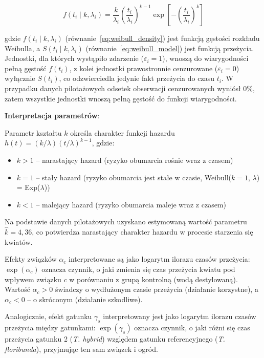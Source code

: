 \documentclass[12pt, a4paper]{article}
\begin{document}
\begin{equation}\label{eq:weibull_density}
    f(t_i \mid k, \lambda_i) = \frac{k}{\lambda_i}\!\left(\frac{t_i}{\lambda_i}\right)^{k-1}
    \exp\!\left[-\!\left(\frac{t_i}{\lambda_i}\right)^k\right]
\end{equation}

gdzie $f(t_i \mid k, \lambda_i)$ (równanie~\eqref{eq:weibull_density}) jest funkcją gęstości rozkładu Weibulla, a $S(t_i \mid k, \lambda_i)$
(równanie~\eqref{eq:weibull_model}) jest funkcją przeżycia. Jednostki, dla których wystąpiło zdarzenie
($\varepsilon_i = 1$), wnoszą do wiarygodności pełną gęstość $f(t_i)$, z kolei
jednostki prawostronnie cenzurowane ($\varepsilon_i = 0$) wyłącznie $S(t_i)$, co odzwierciedla jedynie fakt przeżycia do czasu $t_i$.
W przypadku danych pilotażowych odsetek obserwacji cenzurowanych wyniósł 0\%, 
zatem wszystkie jednostki wnoszą pełną gęstość do funkcji wiarygodności.


\par\textbf{Interpretacja parametrów}: 
\par Parametr kształtu $k$ określa charakter funkcji hazardu $h(t) = (k/\lambda)(t/\lambda)^{k-1}$, gdzie:
\begin{itemize}
    \item $k > 1$ -- narastający hazard (ryzyko obumarcia rośnie wraz z czasem)
    \item $k = 1$ -- stały hazard (ryzyko obumarcia jest stałe w czasie,
    Weibull($k=1$, $\lambda$) = Exp($\lambda$))
    \item  $k < 1$ -- malejący hazard (ryzyko obumarcia maleje wraz z czasem)
\end{itemize} Na podstawie danych pilotażowych uzyskano estymowaną wartość parametru $\hat{k} = 4{,}36$, co potwierdza narastający charakter hazardu w procesie starzenia się kwiatów. 
\par Efekty związków $\alpha_c$ interpretowane są jako logarytm ilorazu czasów przeżycia: $\exp(\alpha_c)$ oznacza czynnik, o jaki zmienia się czas przeżycia kwiatu pod wpływem związku $c$ w porównaniu z grupą kontrolną (wodą destylowaną). Wartość $\alpha_c > 0$ świadczy o wydłużonym czasie przeżycia (działanie korzystne), a $\alpha_c < 0$ -- o skróconym (działanie szkodliwe). 
\par Analogicznie, efekt gatunku $\gamma_s$ interpretowany jest jako logarytm ilorazu czasów przeżycia między gatunkami: $\exp(\gamma_s)$ oznacza czynnik, o jaki różni się czas przeżycia gatunku 2 (\textit{T. hybrid}) względem gatunku referencyjnego (\textit{T. floribunda}), przyjmując ten sam związek i ogród.
\end{document}
